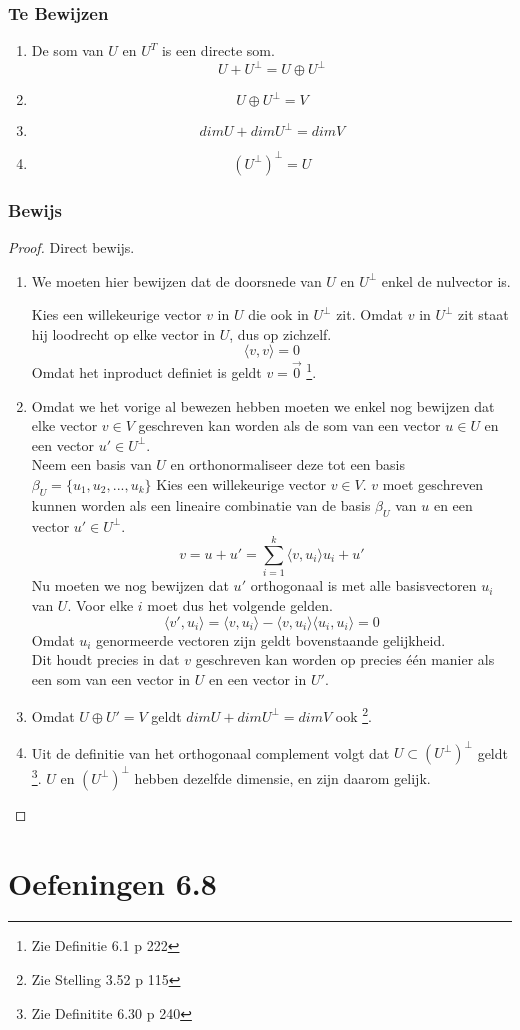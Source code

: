 \documentclass[lineaire_algebra_oplossingen.tex]{subfiles}
\begin{document}
\subsubsection*{Te Bewijzen}
\begin{enumerate}
\item De som van $U$ en $U^T$ is een directe som.
\[U + U^\bot = U \oplus U^\bot\]
\item
\[U\oplus U^\bot = V\]
\item
\[dimU + dimU^\bot = dim V\]
\item
\[(U^\bot)^\bot = U\]
\end{enumerate}

\subsubsection*{Bewijs}
\begin{proof}
Direct bewijs.
\begin{enumerate}
\item
We moeten hier bewijzen dat de doorsnede van $U$ en $U^\bot$ enkel de nulvector is.

Kies een willekeurige vector $v$ in $U$ die ook in $U^\bot$ zit. Omdat $v$ in $U^\bot$ zit staat hij loodrecht op elke vector in $U$, dus op zichzelf.
\[
\langle v,v \rangle = 0
\]
Omdat het inproduct definiet is geldt $v=\vec{0}$ \footnote{Zie Definitie 6.1 p 222}.

\item
Omdat we het vorige al bewezen hebben moeten we enkel nog bewijzen dat elke vector $v\in V$ geschreven kan worden als de som van een vector $u \in U$ en een vector $u'\in U^\bot$.\\
Neem een basis van $U$ en orthonormaliseer deze tot een basis $\beta_U = \{u_1,u_2,...,u_k\}$
Kies een willekeurige vector $v\in V$. $v$ moet geschreven kunnen worden als een lineaire combinatie van de basis $\beta_U$ van $u$ en een vector $u' \in U^\bot$.
\[
v = u + u' = \sum_{i=1}^k\langle v,u_i\rangle u_i + u'
\]
Nu moeten we nog bewijzen dat $u'$ orthogonaal is met alle basisvectoren $u_i$ van $U$. Voor elke $i$ moet dus het volgende gelden.
\[
\langle v',u_i \rangle = \langle v,u_i\rangle - \langle v,u_i\rangle\langle u_i,u_i\rangle = 0
\]
Omdat $u_i$ genormeerde vectoren zijn geldt bovenstaande gelijkheid.\\
Dit houdt precies in dat $v$ geschreven kan worden op precies \'e\'en manier als een som van een vector in $U$ en een vector in $U'$.

\item
Omdat $U \oplus U' = V$ geldt $dimU+dimU^\bot = dimV$ ook \footnote{Zie Stelling 3.52 p 115}.

\item
Uit de definitie van het orthogonaal complement volgt dat $U \subset (U^\bot)^\bot$ geldt \footnote{Zie Definitite 6.30 p 240}. $U$ en $(U^\bot)^\bot$ hebben dezelfde dimensie, en zijn daarom gelijk. 


\end{enumerate}
\end{proof}




\section{Oefeningen 6.8}
\end{document}
